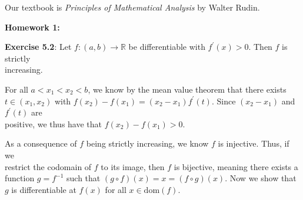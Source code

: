 \documentclass{book}
\newcommand{\pracOne}{
   \color{BrickRed}%
   \fontsize{13}{15}\selectfont%
}
\newcommand{\pracTwo}{
   \color{Orange}%
   \fontsize{12}{14}\selectfont%
}
\newenvironment{myIndent}{%
   \begin{adjustwidth}{2.5em}{0em}%
}{%
   \end{adjustwidth}%
}
\newcommand*{\markHW}[1]{%
   {\huge \color{Black} \textbf{#1} \newline}%
}
\newcommand{\domain}[1]{\mathrm{dom}(#1)}
\newcommand{\retTwo}{\hfill\bigbreak}
\begin{document}
\retTwo

Our textbook is \textit{Principles of Mathematical Analysis} by Walter Rudin.























\newpage
\pracOne

\markHW{Homework 1:}

\textbf{Exercise 5.2}: Let $f: (a, b) \longrightarrow \mathbb{R}$ be differentiable with $f^\prime(x) > 0$. Then $f$ is strictly\\ increasing.

{\begin{myIndent}\pracTwo
   For all $a < x_1 < x_2 < b$, we know by the mean value theorem that there exists\\ $t \in (x_1, x_2)$ with $f(x_2) - f(x_1) = (x_2 - x_1)f^\prime(t)$. Since $(x_2 - x_1)$ and $f^\prime(t)$ are\\ positive, we thus have that $f(x_2) - f(x_1) > 0$.\retTwo
\end{myIndent}}

As a consequence of $f$ being strictly increasing, we know $f$ is injective. Thus, if we\\ restrict the codomain of $f$ to its image, then $f$ is bijective, meaning there exists a\\ function $g = f^{-1}$ such that $(g \circ f)(x) = x = (f \circ g)(x)$. Now we show that\\ $g$ is differentiable at $f(x)$ for all $x \in \domain{f}$.
\end{document}
